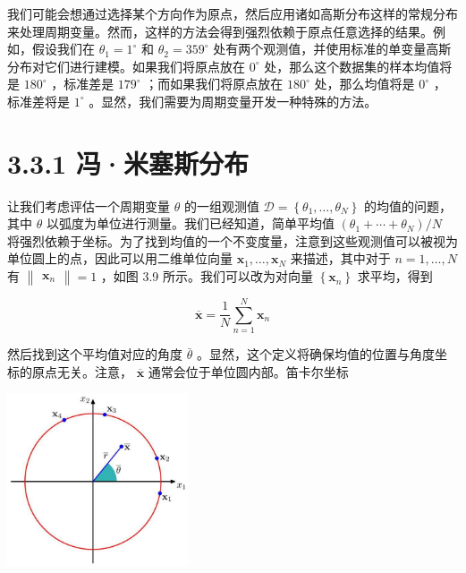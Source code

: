 \documentclass[10pt]{report}
\begin{document}
我们可能会想通过选择某个方向作为原点，然后应用诸如高斯分布这样的常规分布来处理周期变量。然而，这样的方法会得到强烈依赖于原点任意选择的结果。例如，假设我们在 \({\theta }_{1} = {1}^{ \circ  }\) 和 \({\theta }_{2} = {359}^{ \circ  }\) 处有两个观测值，并使用标准的单变量高斯分布对它们进行建模。如果我们将原点放在 \({0}^{ \circ  }\) 处，那么这个数据集的样本均值将是 \({180}^{ \circ  }\) ，标准差是 \({179}^{ \circ  }\) ；而如果我们将原点放在 \({180}^{ \circ  }\) 处，那么均值将是 \({0}^{ \circ  }\) ，标准差将是 \({1}^{ \circ  }\) 。显然，我们需要为周期变量开发一种特殊的方法。

\section*{3.3.1 冯·米塞斯分布}

让我们考虑评估一个周期变量 \(\theta\) 的一组观测值 \(\mathcal{D} = \left\{  {{\theta }_{1},\ldots ,{\theta }_{N}}\right\}\) 的均值的问题，其中 \(\theta\) 以弧度为单位进行测量。我们已经知道，简单平均值 \(\left( {{\theta }_{1} + \cdots  + {\theta }_{N}}\right) /N\) 将强烈依赖于坐标。为了找到均值的一个不变度量，注意到这些观测值可以被视为单位圆上的点，因此可以用二维单位向量 \({\mathbf{x}}_{1},\ldots ,{\mathbf{x}}_{N}\) 来描述，其中对于 \(n = 1,\ldots ,N\) 有 \(\begin{Vmatrix}{\mathbf{x}}_{n}\end{Vmatrix} = 1\) ，如图 3.9 所示。我们可以改为对向量 \(\left\{  {\mathbf{x}}_{n}\right\}\) 求平均，得到

\[
\overline{\mathbf{x}} = \frac{1}{N}\mathop{\sum }\limits_{{n = 1}}^{N}{\mathbf{x}}_{n} \tag{3.117}
\]

然后找到这个平均值对应的角度 \(\bar{\theta }\) 。显然，这个定义将确保均值的位置与角度坐标的原点无关。注意， \(\overline{\mathbf{x}}\) 通常会位于单位圆内部。笛卡尔坐标

\begin{center}
\includegraphics[max width=0.4\textwidth]{images/0194e279-9b28-703a-88f4-c3ac21e2010d_109_975_344_570_546_0.jpg}
\end{center}
\hspace*{3em} 
\end{document}
